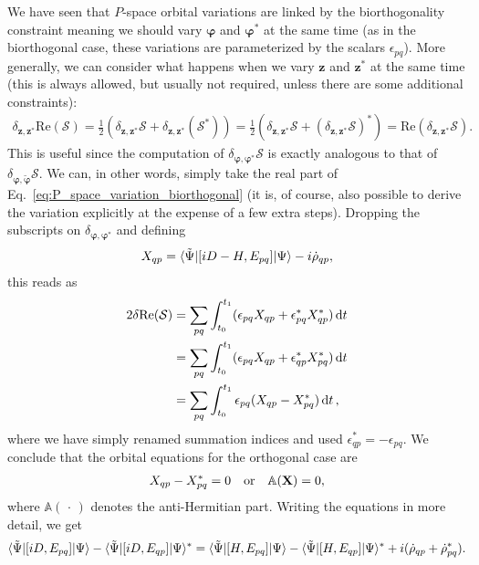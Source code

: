 \documentclass[aip,jcp,preprint,superscriptaddress,nofootinbib]{revtex4-1}
\begin{document}
We have seen that $P$-space orbital variations are linked by the biorthogonality constraint
meaning we should vary $\bm{\varphi}$ and $\bm{\varphi}^*$ at the same time
(as in the biorthogonal case, these variations are parameterized by the scalars $\epsilon_{pq}$).
More generally, we can consider what happens when we vary $\mathbf{z}$ and $\mathbf{z}^*$ at
the same time (this is always allowed, but usually not required, unless there are
some additional constraints):
\begin{align}
    \delta_{\mathbf{z},\mathbf{z}^*} \mathrm{Re}(\mathcal{S}) 
    = \tfrac{1}{2} (\delta_{\mathbf{z},\mathbf{z}^*} \mathcal{S} + \delta_{\mathbf{z},\mathbf{z}^*} (\mathcal{S}^*))
    = \tfrac{1}{2} (\delta_{\mathbf{z},\mathbf{z}^*} \mathcal{S} + (\delta_{\mathbf{z},\mathbf{z}^*} \mathcal{S})^*)
    = \mathrm{Re}(\delta_{\mathbf{z}, \mathbf{z}^*}  \mathcal{S}).
\end{align}
This is useful since the computation of $\delta_{\bm{\varphi}, \bm{\varphi}^*}  \mathcal{S}$
is exactly analogous to that of $\delta_{\bm{\varphi}, \tilde{\bm{\varphi}}}  \mathcal{S}$.
We can, in other words, simply take the real part of Eq.~\eqref{eq:P_space_variation_biorthogonal}
(it is, of course, also possible to derive the variation explicitly at the expense of a few extra steps).
Dropping the subscripts on $\delta_{\bm{\varphi}, \bm{\varphi}^*}$ and defining
\begin{align}
    X_{qp} = \langle \tilde{\Psi} \vert [iD - H, E_{pq}] \vert \Psi \rangle - i \dot{\rho}_{qp},
\end{align}
this reads as
\begin{align}
    2 \delta \mathrm{Re}(\mathcal{S}) 
    &= \sum_{pq} \int_{t_0}^{t_1}  (\epsilon_{pq} X_{qp} + \epsilon_{pq}^* X_{qp}^* ) \dd{t} \nonumber\\
    &= \sum_{pq} \int_{t_0}^{t_1}  (\epsilon_{pq} X_{qp} + \epsilon_{qp}^* X_{pq}^* ) \dd{t} \nonumber\\
    &= \sum_{pq} \int_{t_0}^{t_1} \epsilon_{pq} ( X_{qp} - X_{pq}^* ) \dd{t},
\end{align}
where we have simply renamed summation indices and used $\epsilon_{qp}^* = - \epsilon_{pq}$.
We conclude that the orbital equations for the orthogonal case are
\begin{align}
    X_{qp} - X_{pq}^* = 0 \qqtext{or} \mathbb{A}(\mathbf{X}) = 0,
\end{align}
where $\mathbb{A}(\,\cdot\,)$ denotes the anti-Hermitian part.
Writing the equations in more detail, we get
\begin{gather}
    \langle \tilde{\Psi} \vert [iD, E_{pq}] \vert \Psi \rangle - \langle \tilde{\Psi} \vert [iD, E_{qp}] \vert \Psi \rangle^*
    = \langle \tilde{\Psi} \vert [H, E_{pq}] \vert \Psi \rangle - \langle \tilde{\Psi} \vert [H, E_{qp}] \vert \Psi \rangle^*
    + i (\dot{\rho}_{qp} + \dot{\rho}_{pq}^*).  \nonumber
\end{gather}
\end{document}
